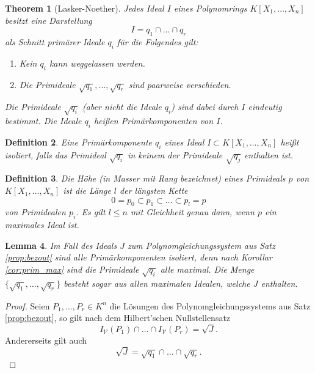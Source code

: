 \documentclass[a4paper,oneside, 11pt, openany%
]{article}
\theoremstyle{custom}
\newtheorem{theorem}{Theorem}[section]
\newtheorem{lemma}[theorem]{Lemma}
\theoremstyle{custom}
\newtheorem{definition}[theorem]{Definition}
\begin{document}
	\begin{theorem}[Lasker-Noether]
		Jedes Ideal $I$ eines Polynomrings $K[X_1,\ldots,X_n]$ besitzt eine Darstellung
		\[I = q_1 \cap \ldots \cap q_r\]
		als Schnitt primärer Ideale $q_i$ für die Folgendes gilt:
		\begin{enumerate}
			\item Kein $q_i$ kann weggelassen werden.
			\item Die Primideale $\sqrt{q_1}, \ldots, \sqrt{q_r}$ sind paarweise verschieden.
		\end{enumerate}
		Die Primideale $\sqrt{q_i}$ (aber nicht die Ideale $q_i$) sind dabei durch $I$ eindeutig bestimmt. Die Ideale $q_i$ heißen Primärkomponenten von $I$.
	\end{theorem}
	\begin{definition}
		Eine Primärkomponente $q_i$ eines Ideal $I \subset K[X_1,\ldots,X_n]$ heißt isoliert, falls das Primideal $\sqrt{q_i}$ in keinem der Primideale $\sqrt{q_j}$ enthalten ist.
	\end{definition}
	\begin{definition}
		Die Höhe (in Masser \cite{masser1983fields} mit Rang bezeichnet) eines Primideals $p$ von $K[X_1,\ldots,X_n]$ ist die Länge $l$ der längsten Kette \[0=p_0 \subset p_1 \subset \ldots \subset p_l = p\] von Primidealen $p_i$. Es gilt $l \leq n$ mit Gleichheit genau dann, wenn $p$ ein maximales Ideal ist.
	\end{definition}
	\begin{lemma}\label{cor:gls_prim_max}
		Im Fall des Ideals $J$ zum Polynomgleichungssystem aus Satz \ref{prop:bezout} sind alle
		Primärkomponenten isoliert, denn nach Korollar \ref{cor:prim_max} sind  die Primideale $\sqrt{q_i}$ alle maximal. Die Menge $\{\sqrt{q_1},\ldots,\sqrt{q_r}\}$ besteht sogar aus allen maximalen Idealen, welche $J$ enthalten.
	\end{lemma}
	\begin{proof}
		Seien $P_1, \ldots, P_r \in K^n$ die Lösungen des Polynomgleichungssystems aus Satz \ref{prop:bezout}, so gilt nach dem Hilbert'schen Nullstellensatz \cite{kunz2013}
		\begin{equation*}
			I_\mathcal{V}(P_1) \cap \ldots \cap I_\mathcal{V}(P_r) = \sqrt{J}.
		\end{equation*}
		Andererseits gilt auch
		\begin{equation*}
			\sqrt{J} = \sqrt{q_1} \cap \ldots \cap \sqrt{q_r}.
		\end{equation*}
	\end{proof}
\end{document}
